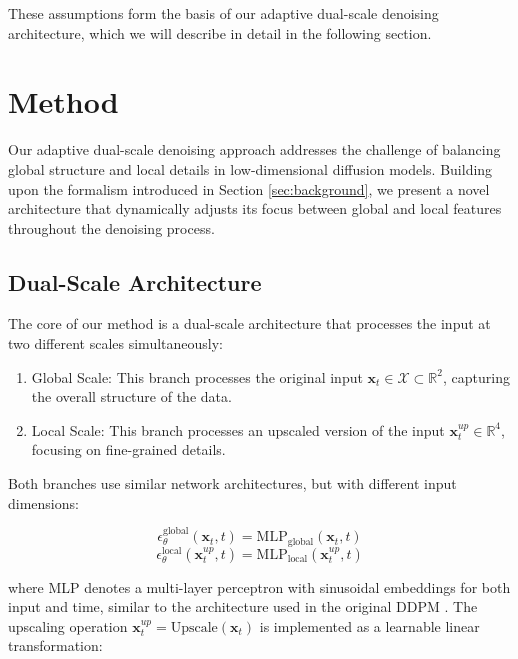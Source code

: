 \documentclass{article} %
\begin{document}
These assumptions form the basis of our adaptive dual-scale denoising architecture, which we will describe in detail in the following section.

\section{Method}
\label{sec:method}

Our adaptive dual-scale denoising approach addresses the challenge of balancing global structure and local details in low-dimensional diffusion models. Building upon the formalism introduced in Section \ref{sec:background}, we present a novel architecture that dynamically adjusts its focus between global and local features throughout the denoising process.

\subsection{Dual-Scale Architecture}
The core of our method is a dual-scale architecture that processes the input at two different scales simultaneously:

\begin{enumerate}
    \item Global Scale: This branch processes the original input $\mathbf{x}_t \in \mathcal{X} \subset \mathbb{R}^2$, capturing the overall structure of the data.
    \item Local Scale: This branch processes an upscaled version of the input $\mathbf{x}_t^{up} \in \mathbb{R}^4$, focusing on fine-grained details.
\end{enumerate}

Both branches use similar network architectures, but with different input dimensions:

\begin{equation}
    \epsilon_\theta^{\text{global}}(\mathbf{x}_t, t) = \text{MLP}_{\text{global}}(\mathbf{x}_t, t)
\end{equation}
\begin{equation}
    \epsilon_\theta^{\text{local}}(\mathbf{x}_t^{up}, t) = \text{MLP}_{\text{local}}(\mathbf{x}_t^{up}, t)
\end{equation}

where MLP denotes a multi-layer perceptron with sinusoidal embeddings for both input and time, similar to the architecture used in the original DDPM \cite{ddpm}. The upscaling operation $\mathbf{x}_t^{up} = \text{Upscale}(\mathbf{x}_t)$ is implemented as a learnable linear transformation:
\end{document}
